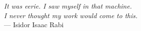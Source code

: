 %
\begin{frontmatter}

%
%
\makefrontmatter

%
%
%
%
%
%
\begin{dedication}
\end{dedication}


%
%



%
%
\begin{epigraph} %
  \emph{It was eerie. I saw myself in that machine.\\
  I never thought my work would come to this. }\\
  --- Isidor Isaac Rabi
\end{epigraph}

%



\end{frontmatter}
